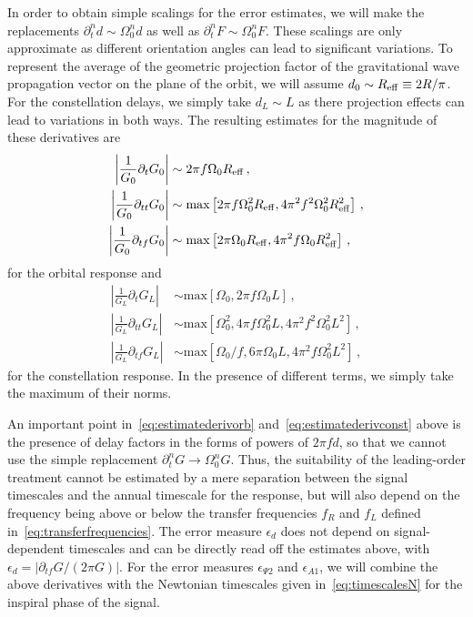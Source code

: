 \documentclass[aps,showpacs,twocolumn,
prd,superscriptaddress,nofootinbib]{revtex4-1}
\begin{document}
In order to obtain simple scalings for the error estimates, we will make the replacements $\partial_{t}^{n} d \sim \Omega_{0}^{n} d$ as well as $\partial_{t}^{n} F \sim \Omega_{0}^{n} F$. These scalings are only approximate as different orientation angles can lead to significant variations. To represent the average of the geometric projection factor of the gravitational wave propagation vector on the plane of the orbit, we will assume $d_{0} \sim R_{\rm eff} \equiv 2R/\pi $. For the constellation delays, we simply take $d_{L} \sim L$ as there projection effects can lead to variations in both ways. The resulting estimates for the magnitude of these derivatives are
\begin{subequations}\label{eq:estimatederivorb}
\begin{align}
	\left| \frac{1}{G_{0}} \partial_{t} G_{0} \right| &\sim 2 \pi f \Omega_{0} R_{\rm eff}\,,\\
	\left| \frac{1}{G_{0}} \partial_{tt} G_{0} \right| &\sim \text{max} \left[ 2 \pi f \Omega_{0}^{2} R_{\rm eff} , 4\pi^{2} f^{2} \Omega_{0}^{2} R_{\rm eff}^{2}\right] \,,\\
	\left| \frac{1}{G_{0}} \partial_{tf} G_{0} \right| &\sim \text{max} \left[ 2 \pi  \Omega_{0} R_{\rm eff}, 4 \pi^{2} f \Omega_{0} R_{\rm eff}^{2} \right] \,,
\end{align}
\end{subequations}
for the orbital response and
\begin{subequations}\label{eq:estimatederivconst}
\begin{align}
	\left| \frac{1}{G_{L}} \partial_{t} G_{L} \right| &\sim \text{max} \left[ \Omega_{0}, 2 \pi f \Omega_{0} L \right] \,,\\
	\left| \frac{1}{G_{L}} \partial_{tt} G_{L} \right| &\sim \text{max} \left[ \Omega_{0}^{2}, 4 \pi f \Omega_{0}^{2} L, 4\pi^{2} f^{2} \Omega_{0}^{2} L^{2} \right] \,,\\
	\left| \frac{1}{G_{L}} \partial_{tf} G_{L} \right| &\sim \text{max} \left[ \Omega_{0}/f, 6 \pi \Omega_{0} L, 4\pi^{2} f \Omega_{0}^{2} L^{2} \right] \,,
\end{align}
\end{subequations}
for the constellation response. In the presence of different terms, we simply take the maximum of their norms.

An important point in~\eqref{eq:estimatederivorb} and~\eqref{eq:estimatederivconst} above is the presence of delay factors in the forms of powers of $2\pi f d$, so that we cannot use the simple replacement $\partial_{t}^{n}G \rightarrow \Omega_{0}^{n}G$. Thus, the suitability of the leading-order treatment cannot be estimated by a mere separation between the signal timescales and the annual timescale for the response, but will also depend on the frequency being above or below the transfer frequencies $f_{R}$ and $f_{L}$ defined in~\eqref{eq:transferfrequencies}. The error measure $\epsilon_{d}$ does not depend on signal-dependent timescales and can be directly read off the estimates above, with $\epsilon_{d} = |\partial_{tf}G/(2\pi G)|$. For the error measures $\epsilon_{\Psi 2}$ and $\epsilon_{A1}$, we will combine the above derivatives with the Newtonian timescales given in~\eqref{eq:timescalesN} for the inspiral phase of the signal.
\end{document}
